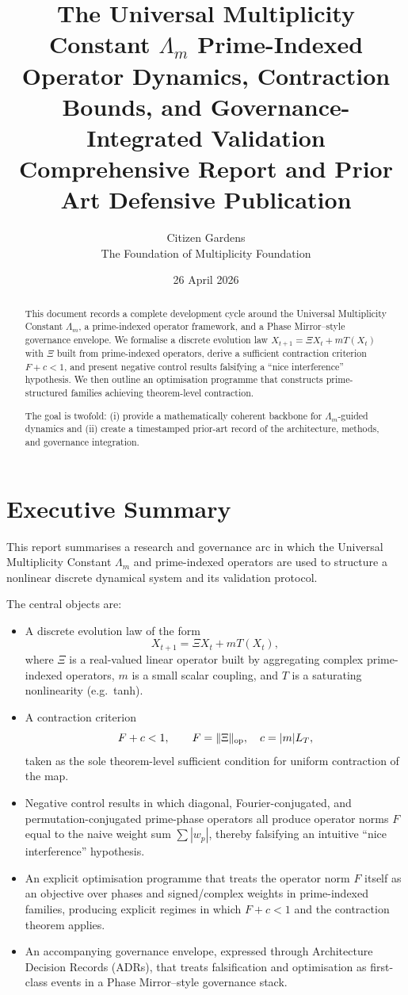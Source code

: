 \documentclass[11pt,letterpaper]{article}
\title{\textbf{The Universal Multiplicity Constant \(\Lambda_m\)}\newline\large
Prime-Indexed Operator Dynamics, Contraction Bounds, and Governance-Integrated Validation\\
Comprehensive Report and Prior Art Defensive Publication}
\author{Citizen Gardens \\ The Foundation of Multiplicity Foundation}
\date{26 April 2026}
\begin{document}
\maketitle

\begin{abstract}
This document records a complete development cycle around the Universal
Multiplicity Constant \(\Lambda_m\), a prime-indexed operator framework,
and a Phase Mirror--style governance envelope.
We formalise a discrete evolution law
\(X_{t+1} = \Xi X_t + m T(X_t)\) with \(\Xi\) built from prime-indexed
operators, derive a sufficient contraction criterion \(F + c < 1\), and
present negative control results falsifying a ``nice interference''
hypothesis. We then outline an optimisation programme that constructs
prime-structured families achieving theorem-level contraction.

The goal is twofold: (i) provide a mathematically coherent backbone for
\(\Lambda_m\)-guided dynamics and (ii) create a timestamped prior-art
record of the architecture, methods, and governance integration.
\end{abstract}
\newpage
\tableofcontents
\newpage
\section{Executive Summary}

This report summarises a research and governance arc in which the
Universal Multiplicity Constant \(\Lambda_m\) and prime-indexed operators
are used to structure a nonlinear discrete dynamical system and its
validation protocol.

The central objects are:

\begin{itemize}[leftmargin=*]
  \item A discrete evolution law of the form
    \[
      X_{t+1} = \Xi X_t + m T(X_t),
    \]
    where \(\Xi\) is a real-valued linear operator built by aggregating
    complex prime-indexed operators, \(m\) is a small scalar coupling,
    and \(T\) is a saturating nonlinearity (e.g.\ tanh).
  \item A contraction criterion
    \[
      F + c < 1, \qquad F = \|\Xi\|_{\rm op},\quad c = |m|L_T,
    \]
    taken as the sole theorem-level sufficient condition for uniform
    contraction of the map.
  \item Negative control results in which diagonal, Fourier-conjugated,
    and permutation-conjugated prime-phase operators all produce operator
    norms \(F\) equal to the naive weight sum \(\sum |w_p|\), thereby
    falsifying an intuitive ``nice interference'' hypothesis.
  \item An explicit optimisation programme that treats the operator norm
    \(F\) itself as an objective over phases and signed/complex
    weights in prime-indexed families, producing explicit regimes in which
    \(F + c < 1\) and the contraction theorem applies.
  \item An accompanying governance envelope, expressed through
    Architecture Decision Records (ADRs), that treats falsification and
    optimisation as first-class events in a Phase Mirror--style
    governance stack.
\end{itemize}
\end{document}

